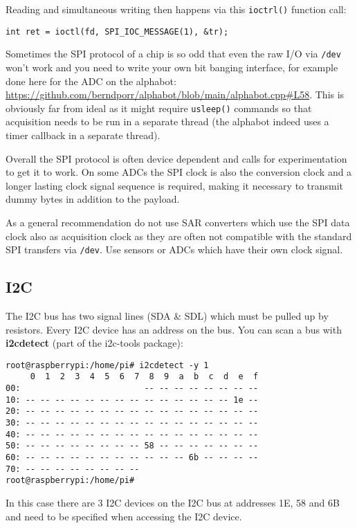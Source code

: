 \documentclass[12pt]{report}
\begin{document}
Reading and simultaneous writing then happens via this \texttt{ioctrl()}
function call:
\begin{verbatim}
int ret = ioctl(fd, SPI_IOC_MESSAGE(1), &tr);
\end{verbatim}

Sometimes the SPI protocol of a chip is so odd that even the raw I/O
via \texttt{/dev} won't work and you need to write your own bit
banging interface, for example done here for the ADC on the alphabot:
\url{https://github.com/berndporr/alphabot/blob/main/alphabot.cpp#L58}.
This is obviously far from ideal as it might require \texttt{usleep()}
commands so that acquisition needs to be run in a separate thread (the
alphabot indeed uses a timer callback in a separate thread).

Overall the SPI protocol is often device dependent and calls
for experimentation to get it to work. On some ADCs the SPI clock is also
the conversion clock and a longer lasting clock signal sequence is required,
making it necessary to transmit dummy bytes in addition to the payload.

As a general recommendation do not use SAR converters which use the
SPI data clock also as acquisition clock as they are often not compatible
with the standard SPI transfers via \texttt{/dev}. Use sensors or ADCs which
have their own clock signal.


\subsection{I2C}
The I2C bus has two signal lines (SDA \& SDL) which must be pulled up
by resistors. Every I2C device has an address on the bus. You can scan
a bus with \textbf{i2cdetect} (part of the i2c-tools package):
\begin{verbatim}
root@raspberrypi:/home/pi# i2cdetect -y 1
     0  1  2  3  4  5  6  7  8  9  a  b  c  d  e  f
00:                         -- -- -- -- -- -- -- -- 
10: -- -- -- -- -- -- -- -- -- -- -- -- -- -- 1e -- 
20: -- -- -- -- -- -- -- -- -- -- -- -- -- -- -- -- 
30: -- -- -- -- -- -- -- -- -- -- -- -- -- -- -- -- 
40: -- -- -- -- -- -- -- -- -- -- -- -- -- -- -- -- 
50: -- -- -- -- -- -- -- -- 58 -- -- -- -- -- -- -- 
60: -- -- -- -- -- -- -- -- -- -- -- 6b -- -- -- -- 
70: -- -- -- -- -- -- -- --                         
root@raspberrypi:/home/pi# 
\end{verbatim}
In this case there are 3 I2C devices on the I2C bus at addresses
1E, 58 and 6B and need to be specified when
accessing the I2C device.
\end{document}
